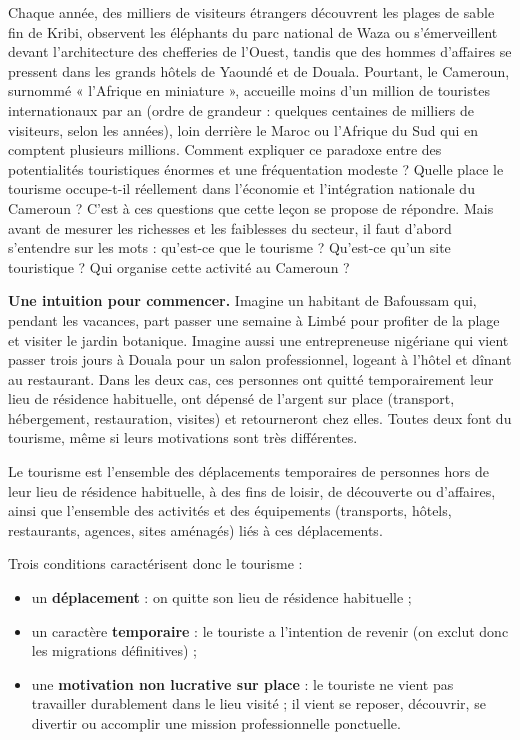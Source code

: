 \documentclass[11pt]{article}
\newcommand{\cle}[1]{{\popxbold\color{popdark}#1}}
\newcounter{popsec}
\newcounter{popsub}
\newcommand{\courssub}[1]{%
  \stepcounter{popsub}%
  \par\vspace{9pt}\noindent{\popxbold\fontsize{11.5}{13}\selectfont\color{popink}{\color{poporange}\thepopsec.\thepopsub}\hspace{6pt}#1}\par\nopagebreak\vspace{4pt}
}
\begin{document}
Chaque année, des milliers de visiteurs étrangers découvrent les plages de sable fin de Kribi, observent les éléphants du parc national de Waza ou s'émerveillent devant l'architecture des chefferies de l'Ouest, tandis que des hommes d'affaires se pressent dans les grands hôtels de Yaoundé et de Douala. Pourtant, le Cameroun, surnommé « l'Afrique en miniature », accueille moins d'un million de touristes internationaux par an (ordre de grandeur : quelques centaines de milliers de visiteurs, selon les années), loin derrière le Maroc ou l'Afrique du Sud qui en comptent plusieurs millions. Comment expliquer ce paradoxe entre des potentialités touristiques énormes et une fréquentation modeste ? Quelle place le tourisme occupe-t-il réellement dans l'économie et l'intégration nationale du Cameroun ? C'est à ces questions que cette leçon se propose de répondre. Mais avant de mesurer les richesses et les faiblesses du secteur, il faut d'abord s'entendre sur les mots : qu'est-ce que le tourisme ? Qu'est-ce qu'un site touristique ? Qui organise cette activité au Cameroun ?

\courssub{Qu'est-ce que le tourisme ?}

\textbf{Une intuition pour commencer.} Imagine un habitant de Bafoussam qui, pendant les vacances, part passer une semaine à Limbé pour profiter de la plage et visiter le jardin botanique. Imagine aussi une entrepreneuse nigériane qui vient passer trois jours à Douala pour un salon professionnel, logeant à l'hôtel et dînant au restaurant. Dans les deux cas, ces personnes ont quitté temporairement leur lieu de résidence habituelle, ont dépensé de l'argent sur place (transport, hébergement, restauration, visites) et retourneront chez elles. Toutes deux font du \cle{tourisme}, même si leurs motivations sont très différentes.

\begin{definition}[Le tourisme]
Le \cle{tourisme} est l'ensemble des déplacements temporaires de personnes hors de leur lieu de résidence habituelle, à des fins de loisir, de découverte ou d'affaires, ainsi que l'ensemble des activités et des équipements (transports, hôtels, restaurants, agences, sites aménagés) liés à ces déplacements.
\end{definition}

Trois conditions caractérisent donc le tourisme :

\begin{itemize}
\item un \textbf{déplacement} : on quitte son lieu de résidence habituelle ;
\item un caractère \textbf{temporaire} : le touriste a l'intention de revenir (on exclut donc les migrations définitives) ;
\item une \textbf{motivation non lucrative sur place} : le touriste ne vient pas travailler durablement dans le lieu visité ; il vient se reposer, découvrir, se divertir ou accomplir une mission professionnelle ponctuelle.
\end{itemize}
\end{document}
